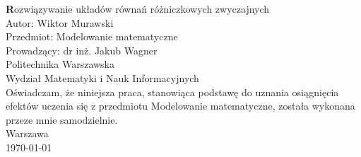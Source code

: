 \documentclass[a4paper, 12pt, twoside, openany]{article}
\date{\today}
\newcommand{\tytul}{Rozwiązywanie układów równań różniczkowych zwyczajnych}
\newcommand{\autor}{Wiktor Murawski}
\newcommand{\uczelnia}{Politechnika Warszawska}
\newcommand{\wydzial}{Wydział Matematyki i Nauk Informacyjnych}
\newcommand{\prowadzacy}{dr inż. Jakub Wagner}
\newcommand{\przedmiot}{Modelowanie matematyczne}
\newcommand{\miejsce}{Warszawa}
\begin{document}
    \begin{titlepage}
        \centering
        \vspace*{1cm}
        \LARGE\textbf \tytul \\
        \vspace{1.5cm}
        \large
        Autor: \autor \\
        \vspace{1cm}
        Przedmiot: \przedmiot \\
        Prowadzący: \prowadzacy \\
        \vspace{2cm}
        \uczelnia \\
        \wydzial \\
        \vspace{2cm}
        Oświadczam, że niniejsza praca, stanowiąca podstawę do uznania osiągnięcia efektów
        uczenia się z przedmiotu Modelowanie matematyczne, została wykonana przeze mnie samodzielnie.\\
        \vspace{2cm}
        \miejsce \\
        \today \\
    \end{titlepage}

    \tableofcontents
    \newpage

\end{document}
